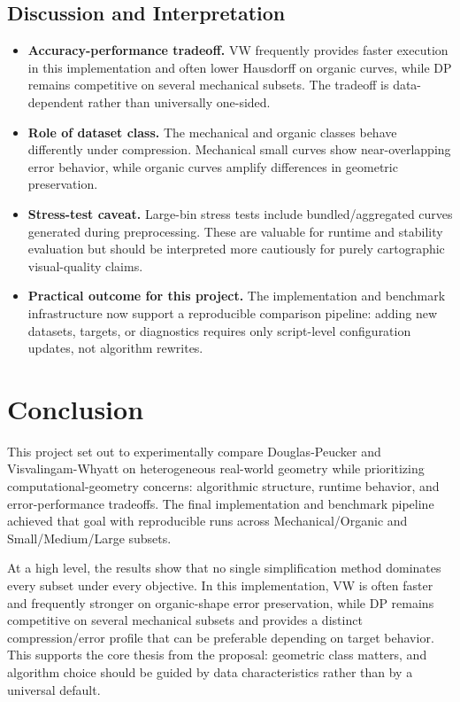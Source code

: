 \documentclass[12pt]{article}
\begin{document}
\subsection{Discussion and Interpretation}
\begin{itemize}
    \item \textbf{Accuracy-performance tradeoff.}  
    VW frequently provides faster execution in this implementation and often lower Hausdorff on organic curves, while DP remains competitive on several mechanical subsets. The tradeoff is data-dependent rather than universally one-sided.
    
    \item \textbf{Role of dataset class.}  
    The mechanical and organic classes behave differently under compression. Mechanical small curves show near-overlapping error behavior, while organic curves amplify differences in geometric preservation.
    
    \item \textbf{Stress-test caveat.}  
    Large-bin stress tests include bundled/aggregated curves generated during preprocessing. These are valuable for runtime and stability evaluation but should be interpreted more cautiously for purely cartographic visual-quality claims.
    
    \item \textbf{Practical outcome for this project.}  
    The implementation and benchmark infrastructure now support a reproducible comparison pipeline: adding new datasets, targets, or diagnostics requires only script-level configuration updates, not algorithm rewrites.
\end{itemize}

\section{Conclusion}
This project set out to experimentally compare Douglas-Peucker and Visvalingam-Whyatt on heterogeneous real-world geometry while prioritizing computational-geometry concerns: algorithmic structure, runtime behavior, and error-performance tradeoffs. The final implementation and benchmark pipeline achieved that goal with reproducible runs across Mechanical/Organic and Small/Medium/Large subsets.

At a high level, the results show that no single simplification method dominates every subset under every objective. In this implementation, VW is often faster and frequently stronger on organic-shape error preservation, while DP remains competitive on several mechanical subsets and provides a distinct compression/error profile that can be preferable depending on target behavior. This supports the core thesis from the proposal: geometric class matters, and algorithm choice should be guided by data characteristics rather than by a universal default.
\end{document}
